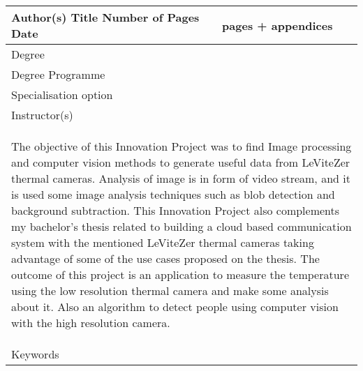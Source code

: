 \documentclass[hidelinks,11pt,a4paper,oneside,article]{memoir}
\begin{document}
\pagestyle{abstract}
\begin{tabular}{ | p{} | p{} |}
	\hline
	Author(s) \newline
	Title \newline\newline 
	Number of Pages \newline
	Date
	& 
	\makeatletter
	\@author \newline
	\@title \newline\newline
	\pageref*{LastPage} pages + \total{chapter} appendices \newline %
	\IfLanguageName {finnish} {\foreignlanguage{english}{\longdate\@date}} {\@date}
	\makeatother
	\\ \hline
	Degree & \metropoliadegree
	\\ \hline
	Degree Programme & \metropoliadegreeprogramme
	\\ \hline
	Specialisation option & \metropoliaspecialisation
	\\ \hline
	Instructor(s) & \metropoliainstructors
	\\ \hline
	\multicolumn{2}{|p{15cm}|}{\begin{singlespacing}\vspace{-22pt}
			The objective of this Innovation Project was to find Image processing and computer vision methods to generate useful data from LeViteZer thermal cameras. Analysis of image is in form of video stream, and it is used some image analysis techniques such as blob detection and background subtraction.\newline
			\newline
			This Innovation Project also complements my bachelor's thesis related to building a cloud based communication system with the mentioned LeViteZer thermal cameras taking advantage of some of the use cases proposed on the thesis.\newline
            \newline				
			The outcome of this project is an application to measure the temperature using the low resolution thermal camera and make some analysis about it. Also an algorithm to detect people using computer vision with the high resolution camera.
			
	\end{singlespacing}} \\[14cm] \hline
	Keywords & \metropoliakeywords
	\\ \hline
\end{tabular}
\clearpage
\end{document}
